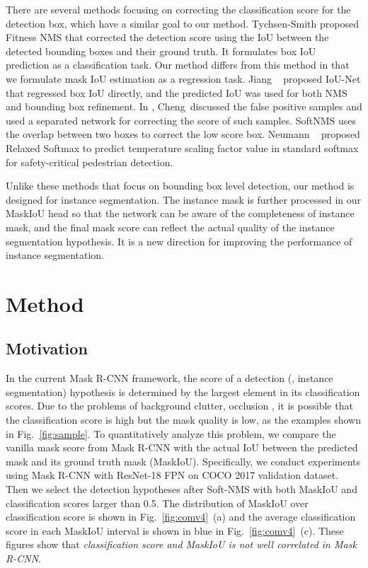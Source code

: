 \documentclass[10pt,twocolumn,letterpaper]{article}
\begin{document}
    There are several methods focusing on correcting the classification score for the detection box, which have a similar goal to our method. 
    Tychsen-Smith \etal \cite{tychsen2017improving} proposed Fitness NMS that corrected the detection score using the IoU between the detected bounding boxes and their ground truth. It formulates box IoU prediction as a classification task. Our method differs from this method in that we formulate mask IoU estimation as a regression task.
    Jiang \etal~\cite{jiang2018acquisition} proposed IoU-Net that regressed box IoU directly, and the predicted IoU was used for both NMS and bounding box refinement. 
    In \cite{cheng2018revisiting}, Cheng~\etal discussed the false positive samples and used a separated network for correcting the score of such samples. 
    SoftNMS \cite{bodla2017softnms} uses the overlap between two boxes to correct the low score box.
    Neumann \etal~\cite{relatedsoftmax_fromvgg} proposed Relaxed Softmax to predict temperature scaling factor value in standard softmax for safety-critical pedestrian detection.
    
    Unlike these methods that focus on bounding box level detection, our method is designed for instance segmentation. The instance mask is further processed in our MaskIoU head so that the network can be aware of the completeness of instance mask, and the final mask score can reflect the actual quality of the instance segmentation hypothesis. It is a new direction for improving the performance of instance segmentation. 
     
    



\section{Method}
\subsection{Motivation}

   In the current Mask R-CNN framework, the score of a detection (\ie, instance segmentation) hypothesis is determined by the largest element in its classification scores. Due to the problems of background clutter, occlusion \etc, it is possible that the classification score is high but the mask quality is low, as the examples shown in Fig.~\ref{fig:sample}. 
   To quantitatively analyze this problem, we compare the vanilla mask score from Mask R-CNN with the actual IoU between the predicted mask and its ground truth mask (MaskIoU).
   Specifically, we conduct experiments using Mask R-CNN with ResNet-18 FPN on COCO 2017 validation dataset. Then we select the detection hypotheses after Soft-NMS with both MaskIoU and classification scores larger than 0.5.
   The distribution of MaskIoU over classification score is shown in Fig.~\ref{fig:comv4}~(a) and the average classification score in each MaskIoU interval is shown in blue in Fig.~\ref{fig:comv4}~(c). These figures show that \textit{classification score and MaskIoU is not well correlated in Mask R-CNN}.
 
\end{document}

